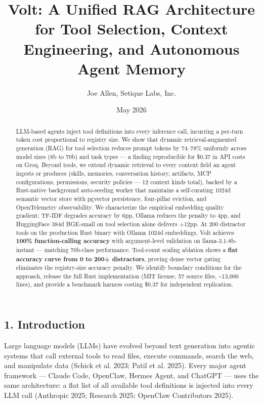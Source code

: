 \documentclass[
  10pt,
]{article}
\title{Volt: A Unified RAG Architecture for Tool Selection, Context
Engineering, and Autonomous Agent Memory}
\author{Joe Allen, Setique Labs, Inc.}
\date{May 2026}
\begin{document}
\maketitle
\begin{abstract}
LLM-based agents inject tool definitions into every inference call,
incurring a per-turn token cost proportional to registry size. We show
that dynamic retrieval-augmented generation (RAG) for tool selection
reduces prompt tokens by 74--78\% uniformly across model sizes (8b to
70b) and task types --- a finding reproducible for \$0.37 in API costs
on Groq. Beyond tools, we extend dynamic retrieval to every context
field an agent ingests or produces (skills, memories, conversation
history, artifacts, MCP configurations, permissions, security policies
--- 12 context kinds total), backed by a Rust-native background
auto-seeding worker that maintains a self-curating 1024d semantic vector
store with pgvector persistence, four-pillar eviction, and OpenTelemetry
observability. We characterize the empirical embedding quality gradient:
TF-IDF degrades accuracy by 6pp, Ollama reduces the penalty to 4pp, and
HuggingFace 384d BGE-small on tool selection alone delivers +12pp. At
200 distractor tools on the production Rust binary with Ollama 1024d
embeddings, Volt achieves \textbf{100\% function-calling accuracy} with
argument-level validation on llama-3.1-8b-instant --- matching 70b-class
performance. Tool-count scaling ablation shows a \textbf{flat accuracy
curve from 0 to 200+ distractors}, proving dense vector gating
eliminates the registry-size accuracy penalty. We identify boundary
conditions for the approach, release the full Rust implementation (MIT
license, 57 source files, \textasciitilde13,000 lines), and provide a
benchmark harness costing \$0.37 for independent replication.
\end{abstract}

\subsection{1. Introduction}\label{introduction}

Large language models (LLMs) have evolved beyond text generation into
agentic systems that call external tools to read files, execute
commands, search the web, and manipulate data (Schick et al. 2023; Patil
et al. 2025). Every major agent framework --- Claude Code, OpenClaw,
Hermes Agent, and ChatGPT --- uses the same architecture: a flat list of
all available tool definitions is injected into every LLM call
(Anthropic 2025; Research 2025; OpenClaw Contributors 2025).
\end{document}
